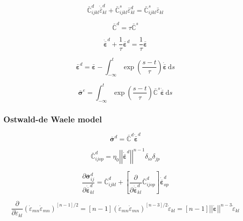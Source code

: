 \documentclass[12pt]{article}
\renewcommand{\d}{\text{d}}
\newcommand{\pder}[2]{\dfrac{\partial #1}{\partial #2}}
\begin{document}
\begin{equation}
\bar{\mathbb{C}}^{d}_{ijkl} \dot{\bar{\varepsilon}}^{d}_{kl} + \bar{\mathbb{C}}^{s}_{ijkl}\bar{\varepsilon}^{d}_{kl} = \bar{\mathbb{C}}^{s}_{ijkl} \bar{\varepsilon}_{kl}
\end{equation}

\begin{equation}
	\bar{\mathbb{C}}^{d} = \tau\bar{\mathbb{C}}^{s}
\end{equation}

\begin{equation}
\dot{\bar{\bm{\varepsilon}}}^{d} + \dfrac{1}{\tau}\bar{\bm{\varepsilon}}^{d} = \dfrac{1}{\tau} \bar{\bm{\varepsilon}}
\end{equation}


\begin{equation}
\bar{\bm{\varepsilon}}^{d} = \bar{\bm{\varepsilon}} - \int_{-\infty}^{t} \exp\left(\dfrac{s-t}{\tau}\right)\dot{\bar{\bm{\varepsilon}}} \,\d s
\end{equation}

\begin{equation}
\bar{\bm{\sigma}}^{e} = \int_{-\infty}^{t} \exp\left(\dfrac{s-t}{\tau}\right)\bar{\mathbb{C}}^{s}\dot{\bar{\bm{\varepsilon}}} \,\d s
\end{equation}


\subsubsection{Ostwald-de Waele model}

\begin{equation}
	\bar{\bm{\sigma}}^{d} = \bar{\mathbb{C}}^{d}\dot{\bar{\bm{\varepsilon}}}^{d}
\end{equation}

\begin{equation}
	 \bar{\mathbb{C}}^{d}_{ijop} = \eta_{0} \left|\left|\dot{\bar{\bm{\varepsilon}}}^{d}\right|\right|^{n-1} \delta_{io}\delta_{jp}
\end{equation}

\begin{equation}
	\pder{\bar{\bm{\sigma}}^{d}_{ij}}{\dot{\bar{\bm{\varepsilon}}}_{kl}^{d}} = \bar{\mathbb{C}}^{d}_{ijkl} + \left[\pder{ }{\dot{\bar{\bm{\varepsilon}}}_{kl}^{d}} \bar{\mathbb{C}}^{d}_{ijop}\right]\dot{\bar{\bm{\varepsilon}}}_{op}^{d}
\end{equation}

\begin{equation}
	\pder{ }{\dot{\varepsilon}_{kl}}\left(\dot{\varepsilon}_{mn}\dot{\varepsilon}_{mn}\right)^{\left[n-1\right]/2} = \left[n-1\right]\left(\dot{\varepsilon}_{mn}\dot{\varepsilon}_{mn}\right)^{\left[n-3\right]/2}\dot{\varepsilon}_{kl} = \left[n-1\right]\left|\left|\dot{\bm{\varepsilon}}\right |\right|^{n-3}\dot{\varepsilon}_{kl}
\end{equation}
\end{document}
